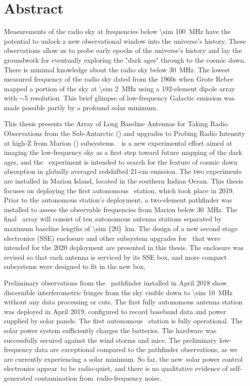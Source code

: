 \section*{Abstract}

Measurements of the radio sky at frequencies below \SI{\sim 100}{\mega \hertz} have the potential to unlock a new observational window into the universe's history. These observations allow us to probe early epochs of the universe's history and lay the groundwork for eventually exploring the "dark ages" through to the cosmic dawn. There is minimal knowledge about the radio sky below \SI{30}{\mega \hertz}. The lowest measured frequency of the radio sky dated from the 1960s when Grote Reber mapped a portion of the sky at \SI{\sim 2}{\mega \hertz} using a 192-element dipole array with $\sim$5 \degree resolution. This brief glimpse of low-frequency Galactic emission was made possible partly by a profound solar minimum.

This thesis presents the Array of Long Baseline Antennas for Taking Radio Observations from the Sub-Antarctic (\albatros) and upgrades to Probing Radio Intensity at high-Z from Marion (\prizm) subsystems. \albatros\ is a new experimental effort aimed at imaging the low-frequency sky as a first step toward future mapping of the dark ages, and the \prizm\ experiment is intended to search for the feature of cosmic dawn absorption in globally averaged redshifted 21-cm emission. The two experiments are installed in Marion Island, located in the southern Indian Ocean.  This thesis focuses on deploying the first autonomous \albatros\ station, which took place in 2019. Prior to the autonomous station's deployment, a two-element pathfinder was installed to assess the observable frequencies from Marion below \SI{30}{\mega \hertz}. The final \albatros\ array will consist of ten autonomous antenna stations separated by maximum baseline lengths of \SI{\sim {20}}{km}. The design of a new second stage electronics (SSE) enclosure and other subsystem upgrades for \prizm\ that were intended for the 2020 deployment are presented in this thesis. The enclosure was revised so that each antenna is serviced by its SSE box, and more compact subsystems were designed to fit in the new box.

Preliminary observations from the \albatros\ pathfinder installed in April 2018 show discernible interferometric fringes from the sky visible down to \SI{\sim 10}{\mega \hertz} without any data processing or cuts. The first fully autonomous antenna station was deployed in April 2019, configured to record baseband data and power supplied by solar panels. The first autonomous \albatros\ station is fully operational. The solar power system sufficiently charges the batteries. The hardware was successfully secured against the wind storms and mice. The preliminary low-frequency data are exceptional compared to the pathfinder observations, as we are currently experiencing a solar minimum. So far, the new solar power control electronics appear to be radio-quiet, and there is no qualitative evidence of self-generated contamination from radio-frequency noise.
